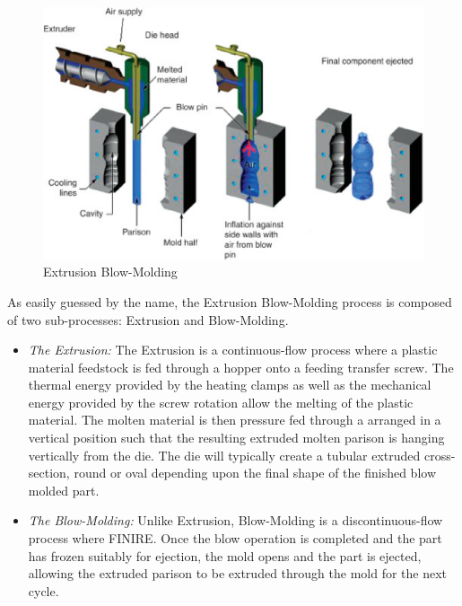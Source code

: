 \begin{figure}
\centerline{\includegraphics[scale=0.75]{images/chapter_1/extrusion_blow_molding.eps}}
\caption{Extrusion Blow-Molding \citep{goodship2015design}}
\label{fig:Extrusion Blow-Molding}
\end{figure}

As easily guessed by the name, the Extrusion Blow-Molding process is composed of two sub-processes: Extrusion and Blow-Molding.

\begin{itemize}
    \item \textit{The Extrusion:} The Extrusion is a continuous-flow process where a plastic material feedstock is fed through a hopper onto a feeding transfer screw. The thermal energy provided by the heating clamps as well as the mechanical energy provided by the screw rotation allow the melting of the plastic material. The molten material is then pressure fed through a arranged in a vertical position such that the resulting extruded molten parison is hanging vertically from the die. The die will typically create a tubular extruded cross-section, round or oval depending upon the final shape of the finished blow molded part.
    \item \textit{The Blow-Molding:} Unlike Extrusion, Blow-Molding is a discontinuous-flow process where FINIRE. Once the blow operation is completed and the part has frozen suitably for ejection, the mold opens and the part is ejected, allowing the extruded parison to be extruded through the mold for the next cycle. 
\end{itemize}

